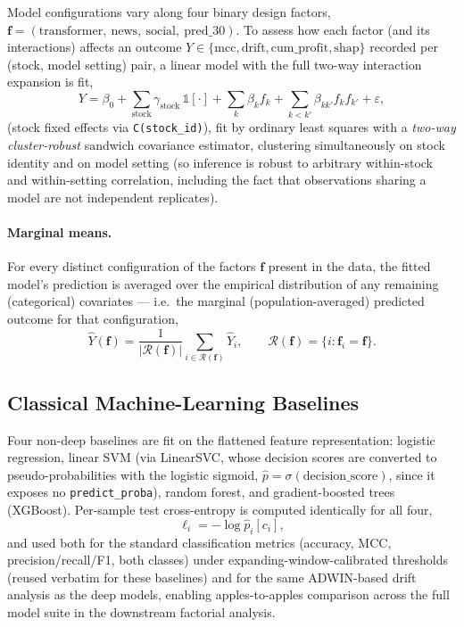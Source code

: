 \documentclass[stu,floatsintext]{apa7}
\newcommand{\I}{\mathbb{1}}
\begin{document}
Model configurations vary along four binary design factors, $\mathbf f = (\text{transformer},\ \text{news},
\ \text{social},\ \text{pred\_30})$. To assess how each factor (and its interactions) affects an outcome
$Y\in\{\mathrm{mcc}, \mathrm{drift}, \mathrm{cum\_profit}, \mathrm{shap}\}$ recorded per (stock, model
setting) pair, a linear model with the full two-way interaction expansion is fit,
\begin{equation}
  \label{eq:ols}
  Y = \beta_0 + \sum_{\text{stock}} \gamma_{\text{stock}}\,\I[\cdot] +
  \sum_{k} \beta_k f_k + \sum_{k<k'} \beta_{kk'} f_k f_{k'} + \varepsilon,
\end{equation}
(stock fixed effects via \texttt{C(stock\_id)}), fit by ordinary least squares with a \emph{two-way
cluster-robust} sandwich covariance estimator, clustering simultaneously on stock identity and on model
setting (so inference is robust to arbitrary within-stock and within-setting correlation, including the
fact that observations sharing a model are not independent replicates).

\paragraph{Marginal means.} For every distinct configuration of the factors $\mathbf f$ present in the
data, the fitted model's prediction is averaged over the empirical distribution of any remaining
(categorical) covariates — i.e.\ the marginal (population-averaged) predicted outcome for that
configuration,
\begin{equation}
  \widehat Y(\mathbf f) = \frac{1}{|\mathcal R(\mathbf f)|}\sum_{i\in\mathcal R(\mathbf f)} \hat Y_i,
  \qquad \mathcal R(\mathbf f) = \{i : \mathbf f_i = \mathbf f\}.
\end{equation}

\subsection{Classical Machine-Learning Baselines}

Four non-deep baselines are fit on the flattened feature representation: logistic regression, linear SVM
(via LinearSVC, whose decision scores are converted to pseudo-probabilities with the logistic
sigmoid, $\hat p = \sigma(\mathrm{decision\_score})$, since it exposes no \texttt{predict\_proba}), random
forest, and gradient-boosted trees (XGBoost). Per-sample test cross-entropy is computed identically for all
four,
\begin{equation}
  \ell_i = -\log \hat p_i[c_i],
\end{equation}
and used both for the standard classification metrics (accuracy, MCC, precision/recall/F1, both classes) under expanding-window-calibrated thresholds (reused verbatim for these baselines) and for the same ADWIN-based drift analysis as the deep models, enabling apples-to-apples comparison across the full model suite in the downstream factorial analysis.
\end{document}
